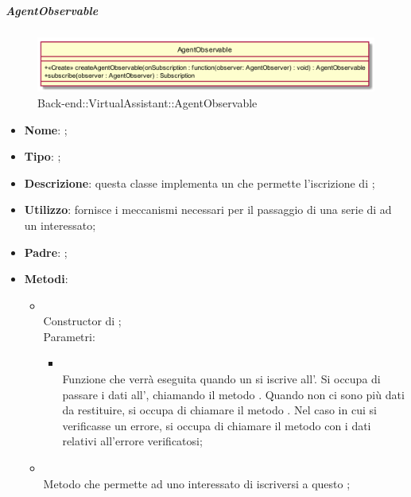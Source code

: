 \hypertarget{AgentObservable_label}{\subparagraph{AgentObservable}}
\begin{figure}[h]
	\centering
	\includegraphics[width=\textwidth,height=\textheight,keepaspectratio]{images/ClassAgentObservable.png}
	\caption{Back-end::VirtualAssistant::AgentObservable}
\end{figure}
\begin{itemize}
	\item \textbf{Nome}: ;
	\item \textbf{Tipo}: ;
	\item \textbf{Descrizione}: questa classe implementa un  che permette l'iscrizione di ;
	\item \textbf{Utilizzo}: fornisce i meccanismi necessari per il passaggio di una serie di  ad un  interessato;
	\item \textbf{Padre}: ;
	\item \textbf{Metodi}:
	\begin{itemize}
		\item[]  \\		Constructor di ;\\
		Parametri:
		\begin{itemize}
			\item {} \\
			Funzione che verrà eseguita quando un  si iscrive all'. Si occupa di passare i dati all', chiamando il metodo . Quando non ci sono più dati da restituire, si occupa di chiamare il metodo . Nel caso in cui si verificasse un errore, si occupa di chiamare il metodo  con i dati relativi all'errore verificatosi;
		\end{itemize}
		\item[]  \\		Metodo che permette ad uno  interessato di iscriversi a questo ;\\

\end{itemize}
\end{itemize}

